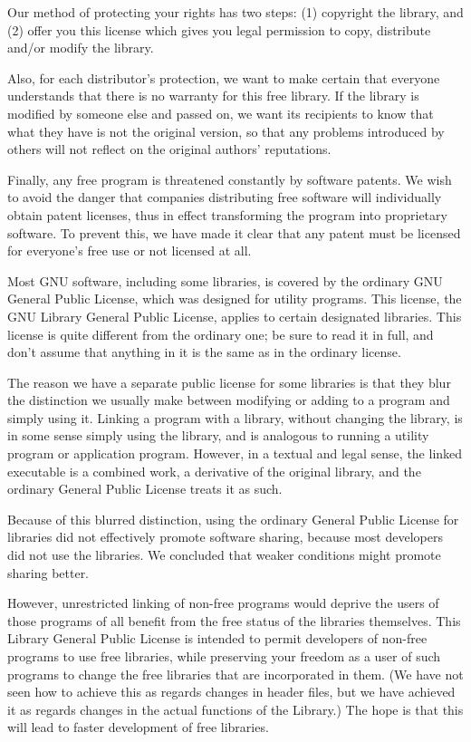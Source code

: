   Our method of protecting your rights has two steps: (1) copyright
the library, and (2) offer you this license which gives you legal
permission to copy, distribute and/or modify the library.

  Also, for each distributor's protection, we want to make certain
that everyone understands that there is no warranty for this free
library.  If the library is modified by someone else and passed on, we
want its recipients to know that what they have is not the original
version, so that any problems introduced by others will not reflect on
the original authors' reputations.

  Finally, any free program is threatened constantly by software
patents.  We wish to avoid the danger that companies distributing free
software will individually obtain patent licenses, thus in effect
transforming the program into proprietary software.  To prevent this,
we have made it clear that any patent must be licensed for everyone's
free use or not licensed at all.

  Most GNU software, including some libraries, is covered by the ordinary
GNU General Public License, which was designed for utility programs.  This
license, the GNU Library General Public License, applies to certain
designated libraries.  This license is quite different from the ordinary
one; be sure to read it in full, and don't assume that anything in it is
the same as in the ordinary license.

  The reason we have a separate public license for some libraries is that
they blur the distinction we usually make between modifying or adding to a
program and simply using it.  Linking a program with a library, without
changing the library, is in some sense simply using the library, and is
analogous to running a utility program or application program.  However, in
a textual and legal sense, the linked executable is a combined work, a
derivative of the original library, and the ordinary General Public License
treats it as such.

  Because of this blurred distinction, using the ordinary General
Public License for libraries did not effectively promote software
sharing, because most developers did not use the libraries.  We
concluded that weaker conditions might promote sharing better.

  However, unrestricted linking of non-free programs would deprive the
users of those programs of all benefit from the free status of the
libraries themselves.  This Library General Public License is intended to
permit developers of non-free programs to use free libraries, while
preserving your freedom as a user of such programs to change the free
libraries that are incorporated in them.  (We have not seen how to achieve
this as regards changes in header files, but we have achieved it as regards
changes in the actual functions of the Library.)  The hope is that this
will lead to faster development of free libraries.

